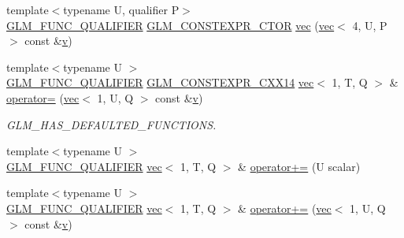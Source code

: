\begin{DoxyCompactItemize}
\item 
{\footnotesize template$<$typename U, qualifier P$>$ }\\\mbox{\hyperlink{setup_8hpp_a33fdea6f91c5f834105f7415e2a64407}{G\+L\+M\+\_\+\+F\+U\+N\+C\+\_\+\+Q\+U\+A\+L\+I\+F\+I\+ER}} \mbox{\hyperlink{setup_8hpp_ad34178a09666081abdb573c14d1f4a5a}{G\+L\+M\+\_\+\+C\+O\+N\+S\+T\+E\+X\+P\+R\+\_\+\+C\+T\+OR}} \mbox{\hyperlink{structglm_1_1vec_3_011_00_01_t_00_01_q_01_4_a488f936163dd6df03df27373e8337869}{vec}} (\mbox{\hyperlink{structglm_1_1vec}{vec}}$<$ 4, U, P $>$ const \&\mbox{\hyperlink{_s_d_l__opengl_8h_a10a82eabcb59d2fcd74acee063775f90}{v}})
\item 
{\footnotesize template$<$typename U $>$ }\\\mbox{\hyperlink{setup_8hpp_a33fdea6f91c5f834105f7415e2a64407}{G\+L\+M\+\_\+\+F\+U\+N\+C\+\_\+\+Q\+U\+A\+L\+I\+F\+I\+ER}} \mbox{\hyperlink{setup_8hpp_a4dd12abf5e1164bc57f3a34671d03844}{G\+L\+M\+\_\+\+C\+O\+N\+S\+T\+E\+X\+P\+R\+\_\+\+C\+X\+X14}} \mbox{\hyperlink{structglm_1_1vec}{vec}}$<$ 1, T, Q $>$ \& \mbox{\hyperlink{structglm_1_1vec_3_011_00_01_t_00_01_q_01_4_a5b41960ee625ae1959386beea2e587f2}{operator=}} (\mbox{\hyperlink{structglm_1_1vec}{vec}}$<$ 1, U, Q $>$ const \&\mbox{\hyperlink{_s_d_l__opengl_8h_a10a82eabcb59d2fcd74acee063775f90}{v}})
\begin{DoxyCompactList}\small\item\em G\+L\+M\+\_\+\+H\+A\+S\+\_\+\+D\+E\+F\+A\+U\+L\+T\+E\+D\+\_\+\+F\+U\+N\+C\+T\+I\+O\+NS. \end{DoxyCompactList}\item 
{\footnotesize template$<$typename U $>$ }\\\mbox{\hyperlink{setup_8hpp_a33fdea6f91c5f834105f7415e2a64407}{G\+L\+M\+\_\+\+F\+U\+N\+C\+\_\+\+Q\+U\+A\+L\+I\+F\+I\+ER}} \mbox{\hyperlink{structglm_1_1vec}{vec}}$<$ 1, T, Q $>$ \& \mbox{\hyperlink{structglm_1_1vec_3_011_00_01_t_00_01_q_01_4_aefbc9c1c018abcb5c7e6ebe8c1d1fc1f}{operator+=}} (U scalar)
\item 
{\footnotesize template$<$typename U $>$ }\\\mbox{\hyperlink{setup_8hpp_a33fdea6f91c5f834105f7415e2a64407}{G\+L\+M\+\_\+\+F\+U\+N\+C\+\_\+\+Q\+U\+A\+L\+I\+F\+I\+ER}} \mbox{\hyperlink{structglm_1_1vec}{vec}}$<$ 1, T, Q $>$ \& \mbox{\hyperlink{structglm_1_1vec_3_011_00_01_t_00_01_q_01_4_a6af79bf388e7df43ec8935271207d6fc}{operator+=}} (\mbox{\hyperlink{structglm_1_1vec}{vec}}$<$ 1, U, Q $>$ const \&\mbox{\hyperlink{_s_d_l__opengl_8h_a10a82eabcb59d2fcd74acee063775f90}{v}})
\item 

\end{DoxyCompactItemize}
